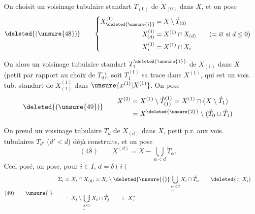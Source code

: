 On choisit un voisinage tubulaire standart $T_{(0)}$ de
$X_{(0)}$ dans $X$, et on pose
\[
\deleted{(\unsure{48})}\qquad
\left\{\begin{aligned}
X^{(1)}_{\deleted{\unsure{i}}}&=X\setminus\mathring T_{(0)}\\
X^{(1)}_{(d)}&=X^{(1)}\cap X_{(d)}\qquad(=\varnothing\text{ si }d\leq0)\\
X^{(1)}_i&=X^{(1)}\cap X_i
\end{aligned}\right.
\]

On  alors un voisinage tubulaire
standart  $T_1^{\deleted{\unsure{1}}}$ de $X_{(1)}$ dans $X$
(petit par rapport au choix de $T_0$), soit $T_1^{(1)}$ sa trace dans
$X^{(1)}$, qui est un vois. tub. standart de $X^{(1)}_{(1)}$ dans
$\unsure{x^{(1)}|X^{(1)}}$. On pose
\[
\deleted{(\unsure{49})}\qquad
\begin{aligned}
X^{(2)}&=X^{(1)}\setminus\mathring T^{(1)}_{(1)}
=X^{(1)}\cap(X\setminus\mathring T_1)\\
&=X^{\deleted{\unsure{2}}}\setminus(\mathring T_0\cup\mathring T_1)
\end{aligned}
\]

On prend un voisinage tubulaire $T_d$ de $X_{(d)}$ dans $X$,
petit p.r. aux vois. tubulaires $T_{d'}$ ($d'<d$) déjà construits,
et on pose
\[
(48)\qquad X^{(d)}=X-\bigcup_{\alpha<d}\mathring T_\alpha.
\]
Ceci posé, on pose, pour $i\in I$, $d=\delta(i)$
\[
(49)\qquad\unsure{|}\quad
\begin{aligned}
\Sigma_i&=X_i\cap X_{(d)}
=X_i\setminus\deleted{\unsure{\{}}\bigcup_{\underset{\sim}{\alpha}<d}X_i\cap
\mathring T_\alpha
\qquad\deleted{\subset X_i}\\
&=X_i\setminus\bigcup_{\underset{\sim}{j}<i}X_i\cap\mathring T_j
\qquad\subset X_i^*
\end{aligned}
\]
